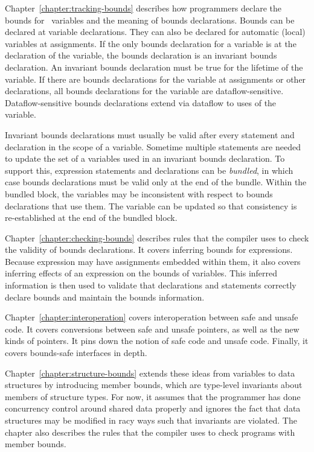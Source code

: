Chapter~\ref{chapter:tracking-bounds} describes how programmers declare the bounds for
\arrayptr\ variables and the meaning of bounds declarations.
Bounds can be declared at variable declarations. They can also be
declared for automatic (local) variables at assignments. If the only
bounds declaration for a variable is at the declaration of the variable,
the bounds declaration is an invariant bounds declaration. An invariant
bounds declaration must be true for the lifetime of the variable. If
there are bounds declarations for the variable at assignments or other
declarations, all bounds declarations for the variable are
dataflow-sensitive. Dataflow-sensitive bounds declarations extend via
dataflow to uses of the variable.

Invariant bounds declarations must usually be valid after every
statement and declaration in the scope of a variable. Sometime multiple
statements are needed to update the set of a variables used in an
invariant bounds declaration. To support this, expression statements and
declarations can be \emph{bundled}, in which case bounds declarations
must be valid only at the end of the bundle. Within the bundled block,
the variables may be inconsistent with respect to bounds declarations
that use them. The variable can be updated so that consistency is
re-established at the end of the bundled block.

Chapter~\ref{chapter:checking-bounds} describes rules that the compiler uses to check the validity
of bounds declarations. It covers inferring bounds for expressions.
Because expression may have assignments embedded within them, it also
covers inferring effects of an expression on the bounds of variables.
This inferred information is then used to validate that declarations and
statements correctly declare bounds and maintain the bounds information.

Chapter~\ref{chapter:interoperation} covers interoperation between 
safe and unsafe code. It covers
conversions between safe and unsafe pointers, as well as the new kinds
of pointers. It pins down the notion of safe code and unsafe code.
Finally, it covers bounds-safe interfaces in depth.

Chapter~\ref{chapter:structure-bounds} extends these ideas from variables to data 
structures by
introducing member bounds, which are type-level invariants about members
of structure types. For now, it assumes that the programmer has done
concurrency control around shared data properly and ignores the fact
that data structures may be modified in racy ways such that invariants
are violated.  The chapter also describes the rules that the compiler
uses to check programs with member bounds.

